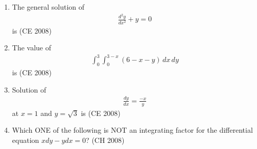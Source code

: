 \begin{enumerate}[label=\thesubsection.\arabic*,ref=\thesubsection.\theenumi]
\begin{enumerate}
\end{enumerate}
\item The general solution of 
\begin{align*} 
\frac{d^2y}{dx^2} + y = 0
\end{align*}
is  \hfill (CE 2008)
\begin{enumerate}
\end{enumerate}
\item The value of 
\begin{align*}
\int_0^3 \int_0^{3-x} (6 - x - y) \, dx \, dy 
\end{align*}
is
\hfill (CE 2008)
\begin{enumerate}
\end{enumerate}
%
\item Solution of \begin{align*} \frac{dy}{dx} = \frac{-x}{y} \end{align*}at $x = 1$ and $y = \sqrt{3}$ is \hfill (CE 2008)
\begin{enumerate}
\end{enumerate}
\item Which ONE of the following is NOT an integrating factor for the differential equation $x dy - y dx = 0$?
\hfill{(CH 2008)}
\begin{enumerate}
\end{enumerate}


\end{enumerate}
